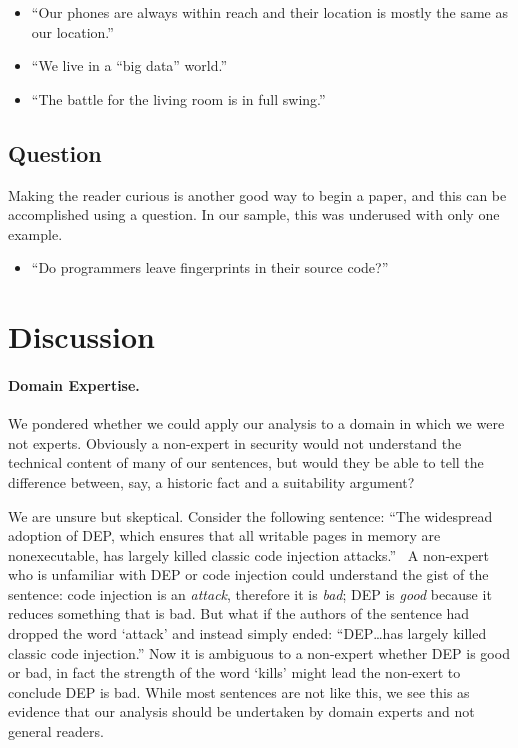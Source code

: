 \documentclass[sigconf,anonymous]{acmart}
\begin{document}
	\begin{itemize}

		\item 	``Our phones are always within reach and their location is mostly the same as our location.''~\cite{michalevsky2015powerspy}

		\item 	``We live in a “big data” world.''~\cite{lecuyer2014xray}

		\item 	``The battle for the living room is in full swing.''~\cite{oren2014aether}
	\end{itemize}


	\subsection{Question}

	Making the reader curious is another good way to begin a paper, and this can be accomplished using a question. In our sample, this was underused with only one example.
	\begin{itemize}
		\item ``Do programmers leave fingerprints in their source code?''~\cite{caliskan2015anonymizing}
	\end{itemize}


	\section{Discussion}
	\label{sec:disc}


	\paragraph{Domain Expertise.} We pondered whether we could apply our analysis to a domain in which we were not experts. Obviously a non-expert in security would not understand the technical content of many of our sentences, but would they be able to tell the difference between, say, a historic fact and a suitability argument?

	We are unsure but skeptical. Consider the following sentence: ``The widespread adoption of DEP, which ensures that all writable pages in memory are nonexecutable, has largely killed classic code injection attacks.''~\cite{carlini2014rop} A non-expert who is unfamiliar with DEP or code injection could understand the gist of the sentence: code injection is an \textit{attack}, therefore it is \textit{bad}; DEP is \textit{good} because it reduces something that is bad. But what if the authors of the sentence had dropped the word `attack' and instead simply ended: ``DEP\ldots has largely killed classic code injection.'' Now it is ambiguous to a non-expert whether DEP is good or bad, in fact the strength of the word `kills' might lead the non-exert to conclude DEP is bad. While most sentences are not like this, we see this as evidence that our analysis should be undertaken by domain experts and not general readers.
\end{document}
